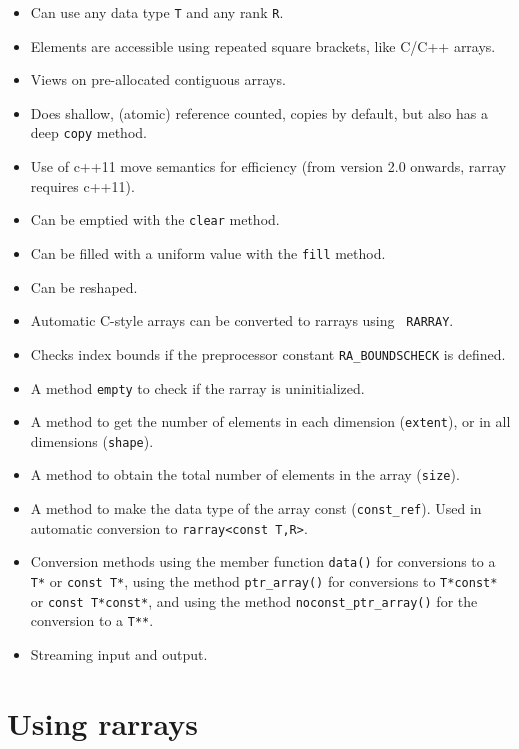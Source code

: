 \documentclass[11pt,twoside]{article}
\begin{document}
\begin{itemize}\itemsep0pt\parskip2pt
\item Can use any data type {\tt T} and any rank {\tt R}.
\item Elements are accessible using repeated square brackets, like C/C++ arrays.
\item Views on pre-allocated contiguous arrays.
\item Does shallow, (atomic) reference counted, copies by default, but also has a deep {\tt copy}
  method.
\item Use of c++11 move semantics for efficiency (from version 2.0
  onwards, rarray requires c++11).
\item Can be emptied with the {\tt clear} method.
\item Can be filled with a uniform value with the {\tt fill} method.
\item Can be reshaped.
\item Automatic C-style arrays can be converted to rarrays using {\tt
  RARRAY}.
\item Checks index bounds if the preprocessor constant {\tt RA\_BOUNDSCHECK} is defined. 
\item A method {\tt empty} to check if the rarray is uninitialized.
\item A method to get the number of elements in each
  dimension (\texttt{extent}), or in all dimensions (\texttt{shape}).
\item A method to obtain the total number of elements in the
  array (\texttt{size}).
\item A method to make the data type of the array const
  (\texttt{const\_ref}).  Used in automatic conversion to \texttt{rarray<const T,R>}.
\item Conversion methods using the member
  function \texttt{data()} for conversions to a \texttt{T*} or
  \texttt{const T*}, using the method \texttt{ptr\_array()} for
  conversions to \texttt{T*const*} or \texttt{const T*const*}, and
  using the method \texttt{noconst\_ptr\_array()} for the conversion to a
  \texttt{T**}.
\item Streaming input and output.
\end{itemize}

\section{Using rarrays}
\end{document}
